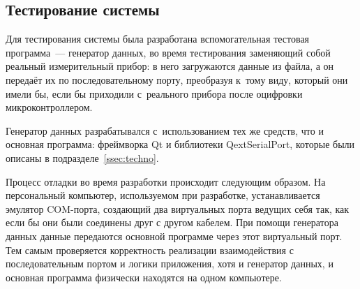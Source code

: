 \documentclass[a4paper, 14pt]{extarticle}
\newcommand{\eng}[1]{{\English #1}}
\newenvironment{myfigure}[2]%
    {\pushQED{\caption{#1} \label{#2}} %
     \begin{figure}[!htb]\centering } %
    {  \popQED %
     \end{figure}}
\newcommand{\includefigure}[3][]{
    \begin{myfigure}{#2}{fig:#3}
      \texttt{[image: \#3]}
    \end{myfigure}
  }
\begin{document}

  \subsection{Тестирование системы}\label{ssec:testing}

  Для тестирования системы была разработана вспомогательная тестовая программа~--- генератор данных,
  во время тестирования заменяющий собой реальный измерительный прибор: в него загружаются данные из
  файла, а он передаёт их по последовательному порту, преобразуя к~тому виду, который они имели бы,
  если бы приходили с~реального прибора после оцифровки микроконтроллером.

  Генератор данных разрабатывался с~использованием тех же средств, что и основная программа:
  фреймворка Qt и библиотеки QextSerialPort, которые были описаны в подразделе~\ref{ssec:techno}.


  Процесс отладки во время разработки происходит следующим образом. На персональный компьютер,
  используемом при разработке, устанавливается эмулятор COM-порта, создающий два виртуальных порта
  ведущих себя так, как если бы они были соединены друг с другом кабелем. При помощи генератора
  данных данные передаются основной программе через этот виртуальный порт. Тем самым проверяется
  корректность реализации взаимодействия с последовательным портом и логики приложения, хотя и
  генератор данных, и основная программа физически находятся на одном компьютере.
\end{document}

